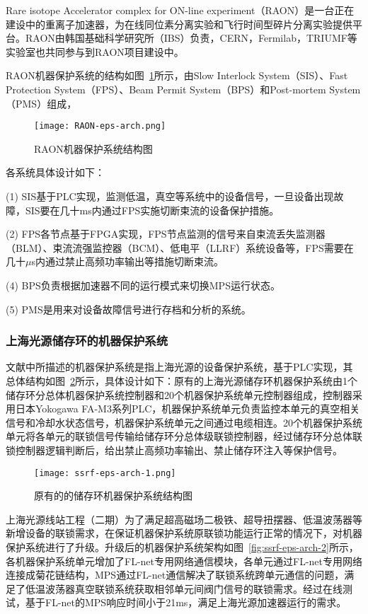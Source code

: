 Rare isotope Accelerator complex for ON-line experiment（RAON）是一台正在建设中的重离子加速器，为在线同位素分离实验和飞行时间型碎片分离实验提供平台。RAON由韩国基础科学研究所（IBS）负责，CERN，Fermilab，TRIUMF等实验室也共同参与到RAON项目建设中。

RAON机器保护系统的结构如图~\ref{fig:RAON-eps-arch}所示，由Slow Interlock System（SIS）、Fast Protection System（FPS）、Beam Permit System（BPS）和Post-mortem System（PMS）组成\cite{hyunchang-2018}，

\begin{figure}[!htb]
	\centering
	\texttt{[image: RAON-eps-arch.png]}
	\caption{RAON机器保护系统结构图}
	\label{fig:RAON-eps-arch}
\end{figure}


各系统具体设计如下：

(1) SIS基于PLC实现，监测低温，真空等系统中的设备信号，一旦设备出现故障，SIS要在几十ms内通过FPS实施切断束流的设备保护措施。

(2) FPS各节点基于FPGA实现，FPS节点监测的信号来自束流丢失监测器（BLM）、束流流强监控器（BCM）、低电平（LLRF）系统设备等，FPS需要在几十$\mu$s内通过禁止高频功率输出等措施切断束流。

(4) BPS负责根据加速器不同的运行模式来切换MPS运行状态。

(5) PMS是用来对设备故障信号进行存档和分析的系统。

\subsubsection{上海光源储存环的机器保护系统}

文献\cite{yu2020}中所描述的机器保护系统是指上海光源的设备保护系统，基于PLC实现，其总体结构如图~\ref{fig:ssrf-eps-arch-1}所示，具体设计如下：原有的上海光源储存环机器保护系统由1个储存环分总体机器保护系统控制器和20个机器保护系统单元控制器组成，控制器采用日本Yokogawa FA-M3系列PLC，机器保护系统单元负责监控本单元的真空相关信号和冷却水状态信号，机器保护系统单元之间通过电缆相连。20个机器保护系统单元将各单元的联锁信号传输给储存环分总体级联锁控制器，经过储存环分总体联锁控制器逻辑判断后，给出禁止高频功率输出、禁止储存环注入等保护信号。

\begin{figure}[!htb]
	\centering
	\texttt{[image: ssrf-eps-arch-1.png]}
	\caption{原有的的储存环机器保护系统结构图}
	\label{fig:ssrf-eps-arch-1}
\end{figure}

上海光源线站工程（二期）为了满足超高磁场二极铁、超导扭摆器、低温波荡器等新增设备的联锁需求，在保证机器保护系统原联锁功能运行正常的情况下，对机器保护系统进行了升级。升级后的机器保护系统架构如图~\ref{fig:ssrf-eps-arch-2}所示，各机器保护系统单元增加了FL-net专用网络通信模块，各单元通过FL-net专用网络连接成菊花链结构，MPS通过FL-net通信解决了联锁系统跨单元通信的问题，满足了低温波荡器真空联锁系统获取相邻单元间阀门信号的联锁需求。经过在线测试，基于FL-net的MPS响应时间小于21ms，满足上海光源加速器运行的需求。

